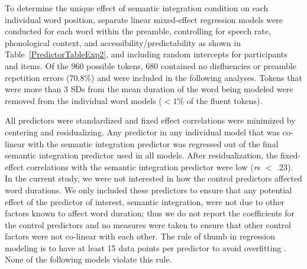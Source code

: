 \documentclass[12pt,titlepage]{article}
\newcommand{\IGNORE}[1]{} %
\begin{document}
\IGNORE{\paragraph{All tokens} }To determine the unique effect of semantic integration condition on each individual word position, separate linear mixed-effect regression models were conducted for each word within the preamble, controlling for speech rate, phonological context, and accessibility/predictability as shown in Table~\ref{PredictorTableExp2}, and including random intercepts for participants and items. Of the 960 possible tokens, 680 contained no disfluencies or preamble repetition errors (70.8\%) and were included in the following analyses. Tokens that were more than 3 SDs from the mean duration of the word being modeled were removed from the individual word models ($< 1\%$ of the fluent tokens).


All predictors were standardized and fixed effect correlations were minimized by centering and residualizing. Any predictor in any individual model that was co-linear with the semantic integration predictor was regressed out of the final semantic integration predictor used in all models. After residualization, the fixed-effect correlations with the semantic integration predictor were low (\textit{r}s $<$ .23). In the current study, we were not interested in how the control predictors affected word durations. We only included these predictors to ensure that any potential effect of the predictor of interest, semantic integration, were not due to other factors known to affect word duration; thus we do not report the coefficients for the control predictors and no measures were taken to ensure that other control factors were not co-linear with each other. The rule of thumb in regression modeling is to have at least 15 data points per predictor to avoid overfitting \cite{Harrell01}. None of the following models violate this rule.%

\end{document}
